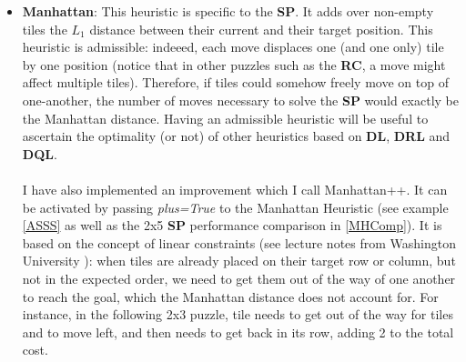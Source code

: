 \begin{itemize}
\item \textbf{Manhattan}: This heuristic is specific to the \textbf{SP}. It adds over non-empty tiles the $L_{1}$ distance between their current and their target position. This heuristic is admissible: indeeed, each move displaces one (and one only) tile by one position (notice that in other puzzles such as the \textbf{RC}, a move might affect multiple tiles). Therefore, if tiles could somehow freely move on top of one-another, the number of moves necessary to solve the \textbf{SP} would exactly be the Manhattan distance. Having an admissible heuristic will be useful to ascertain the optimality (or not) of other heuristics based on \textbf{DL}, \textbf{DRL} and \textbf{DQL}.
\\
\\
I have also implemented an improvement which I call Manhattan++. It can be activated by passing \textit{plus=True} to the Manhattan Heuristic (see example \ref{ASSS} as well as the 2x5 \textbf{SP} performance comparison in \ref{MHComp}). It is based on the concept of linear constraints (see lecture notes from Washington University \cite{SlidingPuzzleLectureNotes}): when tiles are already placed on their target row or column, but not in the expected order, we need to get them out of the way of one another to reach the goal, which the Manhattan distance does not account for. For instance, in the following 2x3 puzzle, tile  \black needs to get out of the way for tiles  \black and  \black to move left, and then needs to get back in its row, adding 2 to the total cost.

\begin{center}
\begin{five}
\end{five}
\end{center}


\end{itemize}
